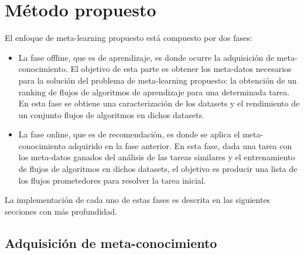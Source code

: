 \section{Método propuesto}\label{sec:proposal}

%

El enfoque de meta-learning propuesto está compuesto por dos fases:
\begin{itemize}
	\item La fase offline, que es de aprendizaje, es donde ocurre la adquisición de meta-conocimiento. El objetivo de esta parte es obtener los meta-datos necesarios para la solución del problema de meta-learning propuesto: la obtención de un ranking de flujos de algoritmos de aprendizaje para una determinada tarea. En esta fase se obtiene una caracterización de los datasets y el rendimiento de un conjunto flujos de algoritmos en dichos datasets.
	\item La fase online, que es de recomendación, es donde se aplica el meta-conocimiento adquirido en la fase anterior. En esta fase, dada una tarea con los meta-datos ganados del análisis de las tareas similares y el entrenamiento de flujos de algoritmos en dichos datasets, el objetivo es producir una lista de los flujos prometedores para resolver la tarea inicial.
\end{itemize}

La implementación de cada uno de estas fases es descrita en las siguientes secciones con más profundidad.

\subsection{Adquisición de meta-conocimiento}\label{sub:adquisicion}

